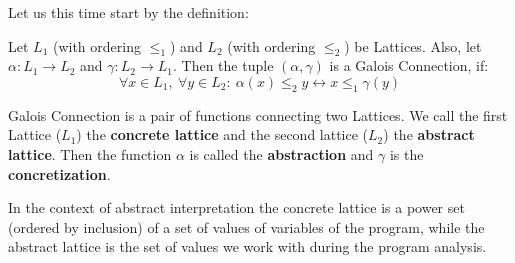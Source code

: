 Let us this time start by the definition:

\begin{defn}
    Let $L_1$ (with ordering $\leq _1$) and $L_2$ (with ordering $\leq _2$) be Lattices.
    Also, let $\alpha: L_1 \rightarrow L_2$ and $\gamma: L_2 \rightarrow L_1$.
    Then the tuple $(\alpha, \gamma)$ is a Galois Connection, if:
    \[ \forall x \in L_1, \: \forall y \in L_2: \: \alpha(x) \leq_2 y \leftrightarrow x \leq_1 \gamma(y)\]
\end{defn}

Galois Connection is a pair of functions connecting two Lattices.
We call the first Lattice ($L_1$) the \textbf{concrete lattice} and the second lattice ($L_2$) the \textbf{abstract lattice}.
Then the function $\alpha$ is called the \textbf{abstraction} and $\gamma$ is the \textbf{concretization}.

In the context of abstract interpretation the concrete lattice is a power set (ordered by inclusion) of a set of values
of variables of the program, while the abstract lattice is the set of values we work with during the program analysis.


